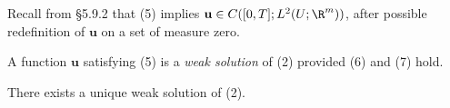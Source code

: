 Recall from \S5.9.2 that (5) implies $\mathbf{u} \in C([0,T]; L^2(U;\R^m))$, after possible redefinition of $\mathbf{u}$ on a set of measure zero.

\begin{definition}
\label{def:weak-solution-reaction-diffusion-system}
A function $\mathbf{u}$ satisfying (5) is a \textit{weak solution} of (2) provided (6) and (7) hold.
\end{definition}

\begin{theorem}
\label{thm:reaction-diffusion-banach-existence}
There exists a unique weak solution of (2).
\end{theorem}
